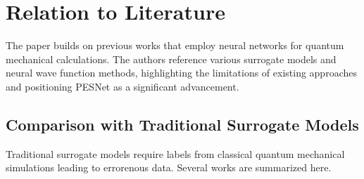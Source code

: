 \documentclass{article}
\begin{document}
\section{Relation to Literature}
The paper builds on previous works that employ neural networks for quantum mechanical calculations. The authors reference various surrogate models and neural wave function methods, highlighting the limitations of existing approaches and positioning PESNet as a significant advancement.

\subsection{Comparison with Traditional Surrogate Models}
Traditional surrogate models require labels from classical quantum mechanical simulations leading to errorenous data. Several works are summarized here.
\end{document}
